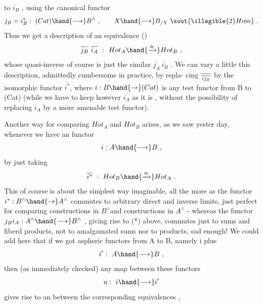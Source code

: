 to $\overline{i_{B}}$ , using the  canonical functor
\[ j_B = i_B^{*} : \ (Cat) \hand{\longrightarrow} B^{\wedge} \ , \qquad X \hand{\longrightarrow} B_{/X} \ \xout{\illegible{2}Hom} \ . \]
Thus we get a description of an equivalence
() \[ \overline{j_B}\ \overline{i_A} \ : \ Hot_A \hand{\xrightarrow{\approx}} Hot_B \ , \]
whose quasi-inverse of course is just the similar $\overline{j_A}\ \overline{i_B}$ . We can vary
a little this description, admittedly cumbersome in practice, by repla-%
cing $\overline{\over{i}{j}_{B}}$ by the isomorphic functor $\overline{i^{*}}$, where $i : B \hand{\to} (Cat)$ is
any test functor from B to (Cat) (while we have to keep however $\overline{i_A}$ as it
is , without the possibility of replacing $i_A$ by a more amenable test
functor).

Another way for comparing $Hot_A$ and $Hot_B$ arises, as we saw yester%
day, whenever we have an \hand{\uline{\textcolor{black}{aspheric}}} functor
 \[ i : A \hand{\longrightarrow} B \ , \]
by just taking
 \[ \overline{i^{*}} \ : \ Hot_B \hand{\xrightarrow{\approx}} Hot_A \ . \]
This of course is about the  simplest way imaginable, all the more
as the functor $i^{*} : B^{\wedge} \hand{\to} A^{\wedge}$ commutes to arbitrary direct and inverse
limits, just perfect for comparing constructions in $B^{\wedge}$and constructions
in $A^{\wedge}$ - whereas the functor $j_B i_A : A^{\wedge} \hand{\longrightarrow} B^{\wedge}$ , giving rise to (*) above,
commutes just to sums and fiberd products, not to amalgamated sums nor
to products, sad enough! We could add here that if we got \hand{\uline{\textcolor{black}{two}}}
aspheric functors from A to B, namely i plus
\[ i' : \ A \hand{\longrightarrow} B \ , \]
then (as immediately checked) any map between these functors
\[ u : \ i \hand{\longrightarrow} i' \]
gives rise to an  between the corresponding equivalences
 ,

